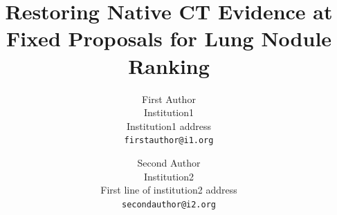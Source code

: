 \documentclass[10pt,twocolumn,letterpaper]{article}
\title{Restoring Native CT Evidence at Fixed Proposals for Lung Nodule Ranking}
\author{First Author\\
Institution1\\
Institution1 address\\
{\tt\small firstauthor@i1.org}
\and
Second Author\\
Institution2\\
First line of institution2 address\\
{\tt\small secondauthor@i2.org}
}
\begin{document}


{
    \small
    
    
}
\end{document}
